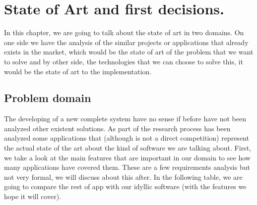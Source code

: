\chapter{State of Art and first decisions. }

In this chapter, we are going to talk about the state of art in two domains.
On one side we have the analysis of the similar projects or applications that
already exists in the market, which would be the state of art of the problem
that we want to solve and by other side, the technologies that we can choose
to solve this, it would be the state of art to the implementation.

\section{Problem domain}

The developing of a new complete system have no sense if before have not been
analyzed other existent solutions. As part of the research process has been
analyzed some applications that (although is not a direct competition) represent
the actual state of the art about the kind of software we are talking about.
\intro
First, we take a look at the main features that are important in our domain
to see how many applications have covered them. These are a few requirements
analysis but not very formal, we will discuss about this after.
\intro
In the following table, we are going to compare the rest of app with our idyllic
software (with the features we hope it will cover).

